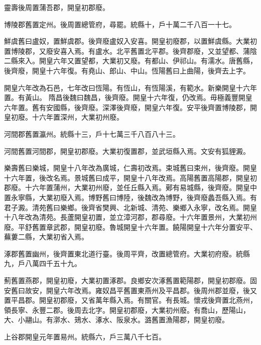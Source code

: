 \begin{pinyinscope}
 靈壽後周置蒲吾郡，開皇初郡廢。



 博陵郡舊置定州。後周置總管府，尋罷。統縣十，戶十萬二千八百一十七。



 鮮虞舊曰盧奴，置鮮虞郡。後齊廢盧奴入安喜。開皇初廢郡，以置鮮虞縣。大業初置博陵郡，又廢安喜入焉。有盧水。北平舊置北平郡。後齊郡廢，又並望都、蒲陰二縣來入。開皇六年又置望都，大業初又廢。有都山、伊祁山。有濡水。唐舊縣，後齊廢，開皇十六年復。有堯山、郎山、中山。恆陽舊曰上曲陽，後齊去上字。



 開皇六年改為石邑，七年改曰恆陽。有恆山，有恆陽溪，有範水。新樂開皇十六年置。有黃山。
 隋昌後魏曰魏昌，後齊廢。開皇十六年復，仍改焉。毋極義豐開皇六年置。舊有安國縣，後齊廢。深澤後齊廢，開皇六年復。安平後齊置博陵郡，開皇初廢。十六年置深州，大業初州廢。



 河間郡舊置瀛州。統縣十三，戶十七萬三千八百八十三。



 河間舊置河間郡，開皇初郡廢。大業初復置郡，並武垣縣入焉。文安有狐貍澱。



 樂壽舊曰樂城，開皇十八年改為廣城，仁壽初改焉。束城舊曰束州，後齊廢。開皇十六年置，後改名焉。景城舊曰成平，開皇十八年改焉。高陽舊置高陽郡，開皇初郡廢。十六年置蒲州，大業初州廢，並任丘縣入焉。鄚有易城縣，後齊廢。開皇中置永寧縣，大業初廢入焉。博野舊曰博陸，後魏改為博野，後齊廢蠡吾縣入焉。有君子澱。清苑舊曰樂鄉。後齊省樊興、北新城、清苑、樂鄉入永寧，改名焉。開皇十八年改為清苑。長蘆開皇初置，並立漳河郡，郡尋廢。十六年置景州，大業初州廢。平舒舊置章武郡，開皇初廢。魯城開皇十六年置。饒陽開皇十六年分置安平、蕪蔞二縣，大業初省入焉。



 涿郡舊置幽州，後齊置東北道行臺。後周平齊，改置總管府。大業初府廢。統縣九，戶八萬四千五十九。



 薊舊置燕郡，開皇初廢，大業初置涿郡。良鄉安次涿舊置範陽郡，開皇初郡廢。固安舊曰故安，開皇六年改焉。雍奴昌平舊置東燕州及平昌郡。後周州郡並廢，後又置平昌郡。開皇初郡廢，又省萬年縣入焉。有關官。有長城。懷戎後齊置北燕州，領長寧、永豐二郡。後周去北字。開皇初郡廢，大業初州廢。有喬山，歷陽山，大、小翮山。有漷水、鳷水、涿水、阪泉水。潞舊置漁陽郡，開皇初廢。



 上谷郡開皇元年置易州。統縣六，戶三萬八千七百。




\end{pinyinscope}

